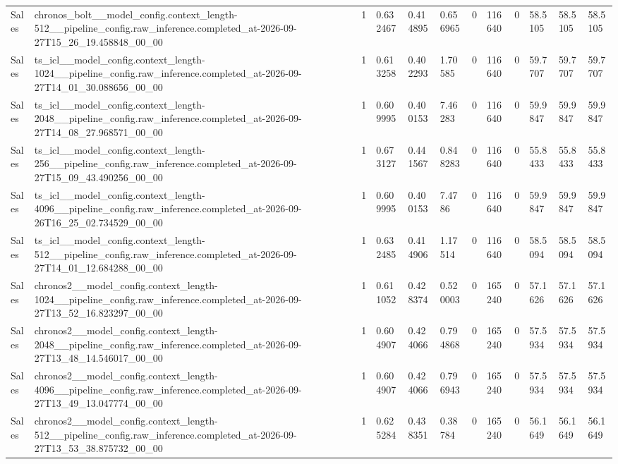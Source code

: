 \begin{tabular}{llllllllllll}
Sales & chronos\_bolt\_\_model\_config.context\_length-512\_\_pipeline\_config.raw\_inference.completed\_at-2026-09-27T15\_26\_19.458848\_00\_00 & 1 & 0.632467 & 0.414895 & 0.656965 & 0 & 116640 & 0 & 58.5105 & 58.5105 & 58.5105 \\
Sales & ts\_icl\_\_model\_config.context\_length-1024\_\_pipeline\_config.raw\_inference.completed\_at-2026-09-27T14\_01\_30.088656\_00\_00 & 1 & 0.613258 & 0.402293 & 1.70585 & 0 & 116640 & 0 & 59.7707 & 59.7707 & 59.7707 \\
Sales & ts\_icl\_\_model\_config.context\_length-2048\_\_pipeline\_config.raw\_inference.completed\_at-2026-09-27T14\_08\_27.968571\_00\_00 & 1 & 0.609995 & 0.400153 & 7.46283 & 0 & 116640 & 0 & 59.9847 & 59.9847 & 59.9847 \\
Sales & ts\_icl\_\_model\_config.context\_length-256\_\_pipeline\_config.raw\_inference.completed\_at-2026-09-27T15\_09\_43.490256\_00\_00 & 1 & 0.673127 & 0.441567 & 0.848283 & 0 & 116640 & 0 & 55.8433 & 55.8433 & 55.8433 \\
Sales & ts\_icl\_\_model\_config.context\_length-4096\_\_pipeline\_config.raw\_inference.completed\_at-2026-09-26T16\_25\_02.734529\_00\_00 & 1 & 0.609995 & 0.400153 & 7.4786 & 0 & 116640 & 0 & 59.9847 & 59.9847 & 59.9847 \\
Sales & ts\_icl\_\_model\_config.context\_length-512\_\_pipeline\_config.raw\_inference.completed\_at-2026-09-27T14\_01\_12.684288\_00\_00 & 1 & 0.632485 & 0.414906 & 1.17514 & 0 & 116640 & 0 & 58.5094 & 58.5094 & 58.5094 \\
Sales & chronos2\_\_model\_config.context\_length-1024\_\_pipeline\_config.raw\_inference.completed\_at-2026-09-27T13\_52\_16.823297\_00\_00 & 1 & 0.611052 & 0.428374 & 0.520003 & 0 & 165240 & 0 & 57.1626 & 57.1626 & 57.1626 \\
Sales & chronos2\_\_model\_config.context\_length-2048\_\_pipeline\_config.raw\_inference.completed\_at-2026-09-27T13\_48\_14.546017\_00\_00 & 1 & 0.604907 & 0.424066 & 0.794868 & 0 & 165240 & 0 & 57.5934 & 57.5934 & 57.5934 \\
Sales & chronos2\_\_model\_config.context\_length-4096\_\_pipeline\_config.raw\_inference.completed\_at-2026-09-27T13\_49\_13.047774\_00\_00 & 1 & 0.604907 & 0.424066 & 0.796943 & 0 & 165240 & 0 & 57.5934 & 57.5934 & 57.5934 \\
Sales & chronos2\_\_model\_config.context\_length-512\_\_pipeline\_config.raw\_inference.completed\_at-2026-09-27T13\_53\_38.875732\_00\_00 & 1 & 0.625284 & 0.438351 & 0.38784 & 0 & 165240 & 0 & 56.1649 & 56.1649 & 56.1649 \\

\end{tabular}
